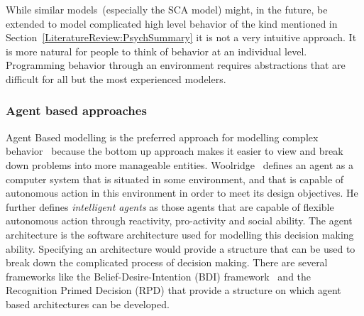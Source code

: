 While similar models~(especially the SCA model) might, in the future, be extended to model complicated high level behavior of the kind mentioned in Section~\ref{LiteratureReview:PsychSummary} it is not a very intuitive approach. It is more natural for people to think of behavior at an individual level. Programming behavior through an environment requires abstractions that are difficult for all but the most experienced modelers.

\subsubsection{Agent based approaches}


 Agent Based modelling is the preferred approach for modelling complex behavior~\cite{Epstein:1999vn,Bonabeau:2002um,Li:2008wt} because the bottom up approach makes it easier to view and break down problems into more manageable entities. Woolridge~\cite{IntelligentAgentsWoolridge} defines an agent as a computer system that is situated in some environment, and that is capable of autonomous action in this environment in order to meet its design objectives. He further defines \emph{intelligent agents} as those agents that are capable of flexible autonomous action through reactivity, pro-activity and social ability. The agent architecture is the software architecture used for modelling this decision making ability. Specifying an architecture would provide a structure that can be used to break down the complicated process of decision making. There are several frameworks like the Belief-Desire-Intention (BDI) framework~\cite{BDI} and the Recognition Primed Decision (RPD) that provide a structure on which agent based architectures can be developed.


